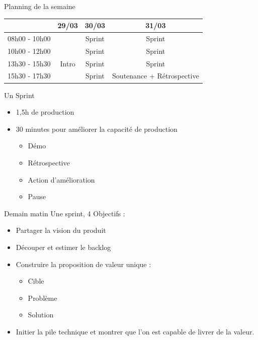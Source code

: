 \documentclass{beamer}
\begin{document}

\begin{frame}{Planning de la semaine}{}
  {
    \center
    \begin{tabular}{l | c | c | c | }
      & \textbf{29/03} & \textbf{30/03} & \textbf{31/03} \\
      \hline
      08h00 - 10h00 &       & Sprint & Sprint \\
      \hline
      10h00 - 12h00 &       & Sprint & Sprint \\
      \hline
      \hline
      13h30 - 15h30 & Intro & Sprint & Sprint \\
      \hline
      15h30 - 17h30 &       & Sprint & Soutenance + Rétrospective \\
      \hline
    \end{tabular}
  }

\end{frame}

\begin{frame}{Un Sprint}
  \begin{itemize}
    \item 1,5h de production
    \item 30 minutes pour améliorer la capacité de production
    \begin{itemize}
      \item Démo
      \item Rétrospective
      \item Action d'amélioration
      \item Pause
    \end{itemize}
  \end{itemize}
\end{frame}

\begin{frame}{Demain matin}
  Une sprint, 4 Objectifs : 
  \begin{itemize}
    \item Partager la vision du produit
    \item Découper et estimer le backlog
    \item Construire la proposition de valeur unique :
    \begin{itemize}
      \item Cible
      \item Problème
      \item Solution
    \end{itemize}
    \item Initier la pile technique et montrer que l'on est capable de livrer de la valeur.
  \end{itemize}
\end{frame}
\end{document}
